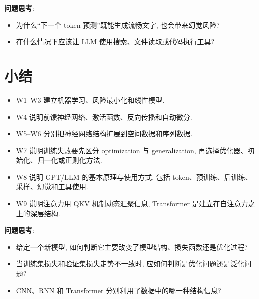 \documentclass{../nndlcourse}
\begin{document}
\textbf{问题思考}:
\begin{itemize}
    \item 为什么“下一个 token 预测”既能生成流畅文字, 也会带来幻觉风险?
    \item 在什么情况下应该让 LLM 使用搜索、文件读取或代码执行工具?
\end{itemize}

\section{小结}

\begin{itemize}
    \item W1--W3 建立机器学习、风险最小化和线性模型.
    \item W4 说明前馈神经网络、激活函数、反向传播和自动微分.
    \item W5--W6 分别把神经网络结构扩展到空间数据和序列数据.
    \item W7 说明训练失败要先区分 optimization 与 generalization, 再选择优化器、初始化、归一化或正则化方法.
    \item W8  说明 GPT/LLM 的基本原理与使用方式, 包括 token、预训练、后训练、采样、幻觉和工具使用.
    \item W9 说明注意力用 QKV 机制动态汇聚信息, Transformer 是建立在自注意力之上的深层结构.
\end{itemize}

\textbf{问题思考}:
\begin{itemize}
    \item 给定一个新模型, 如何判断它主要改变了模型结构、损失函数还是优化过程?
    \item 当训练集损失和验证集损失走势不一致时, 应如何判断是优化问题还是泛化问题?
    \item CNN、RNN 和 Transformer 分别利用了数据中的哪一种结构信息?
\end{itemize}
\end{document}

